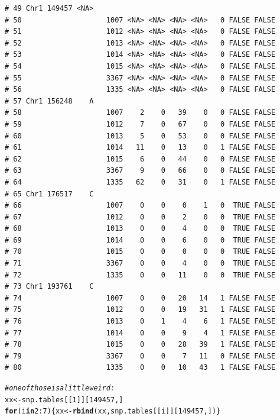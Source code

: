 \documentclass{article}\usepackage[]{graphicx}\usepackage[]{color}
\makeatletter
\newcommand{\hlnum}[1]{\textcolor[rgb]{0.686,0.059,0.569}{#1}}%
\newcommand{\hlcom}[1]{\textcolor[rgb]{0.678,0.584,0.686}{\textit{#1}}}%
\newcommand{\hlopt}[1]{\textcolor[rgb]{0,0,0}{#1}}%
\newcommand{\hlstd}[1]{\textcolor[rgb]{0.345,0.345,0.345}{#1}}%
\newcommand{\hlkwa}[1]{\textcolor[rgb]{0.161,0.373,0.58}{\textbf{#1}}}%
\newcommand{\hlkwb}[1]{\textcolor[rgb]{0.69,0.353,0.396}{#1}}%
\newcommand{\hlkwd}[1]{\textcolor[rgb]{0.737,0.353,0.396}{\textbf{#1}}}%
\newenvironment{kframe}{%
 \def\at@end@of@kframe{}%
 \ifinner\ifhmode%
  \def\at@end@of@kframe{\end{minipage}}%
  \begin{minipage}{\columnwidth}%
 \fi\fi%
 \def\FrameCommand##1{\hskip\@totalleftmargin \hskip-\fboxsep
 \colorbox{shadecolor}{##1}\hskip-\fboxsep
     \hskip-\linewidth \hskip-\@totalleftmargin \hskip\columnwidth}%
 \MakeFramed {\advance\hsize-\width
   \@totalleftmargin\z@ \linewidth\hsize
   \@setminipage}}%
 {\par\unskip\endMakeFramed%
 \at@end@of@kframe}
\newenvironment{knitrout}{}{} %
\makeatother
\begin{document}
\begin{knitrout}
\begin{kframe}
\begin{verbatim}
# 49 Chr1 149457 <NA>                                                   
# 50                    1007 <NA> <NA> <NA> <NA>   0 FALSE FALSE        
# 51                    1012 <NA> <NA> <NA> <NA>   0 FALSE FALSE        
# 52                    1013 <NA> <NA> <NA> <NA>   0 FALSE FALSE        
# 53                    1014 <NA> <NA> <NA> <NA>   0 FALSE FALSE        
# 54                    1015 <NA> <NA> <NA> <NA>   0 FALSE FALSE        
# 55                    3367 <NA> <NA> <NA> <NA>   0 FALSE FALSE        
# 56                    1335 <NA> <NA> <NA> <NA>   0 FALSE FALSE        
# 57 Chr1 156248    A                                                   
# 58                    1007    2    0   39    0   0 FALSE FALSE        
# 59                    1012    7    0   67    0   0 FALSE FALSE        
# 60                    1013    5    0   53    0   0 FALSE FALSE        
# 61                    1014   11    0   13    0   1 FALSE FALSE        
# 62                    1015    6    0   44    0   0 FALSE FALSE        
# 63                    3367    9    0   66    0   0 FALSE FALSE        
# 64                    1335   62    0   31    0   1 FALSE FALSE        
# 65 Chr1 176517    C                                                   
# 66                    1007    0    0    0    1   0  TRUE FALSE        
# 67                    1012    0    0    2    0   0  TRUE FALSE        
# 68                    1013    0    0    4    0   0  TRUE FALSE        
# 69                    1014    0    0    6    0   0  TRUE FALSE        
# 70                    1015    0    0    0    0   0  TRUE FALSE        
# 71                    3367    0    0    4    0   0  TRUE FALSE        
# 72                    1335    0    0   11    0   0  TRUE FALSE        
# 73 Chr1 193761    C                                                   
# 74                    1007    0    0   20   14   1 FALSE FALSE        
# 75                    1012    0    0   19   31   1 FALSE FALSE        
# 76                    1013    0    1    4    6   1 FALSE FALSE        
# 77                    1014    0    0    9    4   1 FALSE FALSE        
# 78                    1015    0    0   28   39   1 FALSE FALSE        
# 79                    3367    0    0    7   11   0 FALSE FALSE        
# 80                    1335    0    0   10   43   1 FALSE FALSE
\end{verbatim}
\begin{alltt}
\hlcom{# one of those is a little weird:}
\hlstd{xx}\hlkwb{<-}\hlstd{snp.tables[[}\hlnum{1}\hlstd{]][}\hlnum{149457}\hlstd{,]}
\hlkwa{for} \hlstd{(i} \hlkwa{in} \hlnum{2}\hlopt{:}\hlnum{7}\hlstd{)\{xx} \hlkwb{<-} \hlkwd{rbind}\hlstd{(xx,snp.tables[[i]][}\hlnum{149457}\hlstd{,])\}}

\end{alltt}
\end{kframe}
\end{knitrout}
\end{document}
